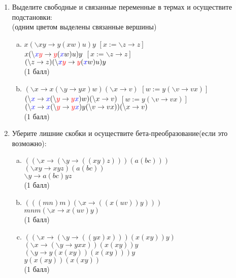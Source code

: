 \documentclass[10pt]{report}
\def\ar{\rightarrow}     %
\def\l{\backslash}       %
\newenvironment{MyList}[1][4pt]{
  \begin{enumerate}[1.]
  \setlength{\parskip}{0pt}
  \setlength{\itemsep}{#1}
}{       
  \end{enumerate}
}
\newenvironment{MyList}[1][4pt]{
  \begin{enumerate}[0.]
  \setlength{\parskip}{0pt}
  \setlength{\itemsep}{#1}
}{       
  \end{enumerate}
}
\begin{document}
\begin{MyList}[8pt]

\item Выделите свободные и связанные переменные в термах и осуществите подстановки:\\
(одним цветом выделены связанные вершины)
\begin{enumerate}[a)]

\item $x (\l xy \ar y (x w) u) y$  $[x := \l z \ar z]$\\
$x(\l \textcolor{blue}{x} \textcolor{red}{y} \ar \textcolor{red}{y} (\textcolor{blue}{x} w) u) y$  $[x := \l z \ar z]$\\
$(\l z \ar z) (\l \textcolor{blue}{x} \textcolor{red}{y} \ar \textcolor{red}{y} (\textcolor{blue}{x} w) u) y$\\
(1 балл)\\

\item $(\l x \ar x (\l y \ar y x) w) (\l x \ar v)$ $[w := y (\l v \ar v x)]$\\
$(\l \textcolor{blue}{x} \ar \textcolor{blue}{x} (\l \textcolor{red}{y} \ar \textcolor{red}{y} \textcolor{blue}{x}) w) (\l x \ar v)$ $[w := y (\l v \ar v x)]$\\
$(\l \textcolor{blue}{x} \ar \textcolor{blue}{x} (\l \textcolor{red}{y} \ar \textcolor{red}{y} \textcolor{blue}{x}) y (\l v \ar v x)) (\l x \ar v)$ \\
(1 балл)
\end{enumerate}


\item Уберите лишние скобки и осуществите бета-преобразование(если это
возможно):
\begin{enumerate}[a)]
\item $((\l x \ar (\l y \ar ((x y) z))) (a (b c)))$\\
$(\l x y \ar x y z) (a (b c))$\\
$\l y \ar a (b c) y z$\\
(1 балл)\\

\item $(((m n) m) (\l x \ar ((x (u v)) y))) $\\
$m n m (\l x \ar x (u v) y) $\\
(1 балл)\\

\item $((\l x \ar (\l y \ar ((y x) x))) (x (x y)) y)$\\
$(\l x \ar (\l y \ar y x x))(x (x y)) y$\\
$(\l y \ar y (x (x y)) (x (x y))) y$\\
$y (x (x y)) (x (x y))$\\
(1 балл)


\end{enumerate}
\end{MyList}
\end{document}
